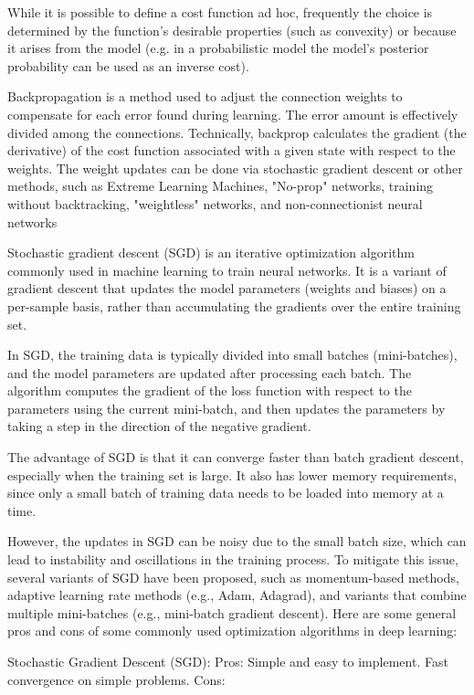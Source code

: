 While it is possible to define a cost function ad hoc, frequently the choice is determined by the function's desirable properties (such as convexity) or because it arises from the model (e.g. in a probabilistic model the model's posterior probability can be used as an inverse cost).

Backpropagation is a method used to adjust the connection weights to compensate for each error found during learning. The error amount is effectively divided among the connections. Technically, backprop calculates the gradient (the derivative) of the cost function associated with a given state with respect to the weights. The weight updates can be done via stochastic gradient descent or other methods, such as Extreme Learning Machines, "No-prop" networks, training without backtracking, "weightless" networks, and non-connectionist neural networks

Stochastic gradient descent (SGD) is an iterative optimization algorithm commonly used in machine learning to train neural networks. It is a variant of gradient descent that updates the model parameters (weights and biases) on a per-sample basis, rather than accumulating the gradients over the entire training set.

In SGD, the training data is typically divided into small batches (mini-batches), and the model parameters are updated after processing each batch. The algorithm computes the gradient of the loss function with respect to the parameters using the current mini-batch, and then updates the parameters by taking a step in the direction of the negative gradient.

The advantage of SGD is that it can converge faster than batch gradient descent, especially when the training set is large. It also has lower memory requirements, since only a small batch of training data needs to be loaded into memory at a time.

However, the updates in SGD can be noisy due to the small batch size, which can lead to instability and oscillations in the training process. To mitigate this issue, several variants of SGD have been proposed, such as momentum-based methods, adaptive learning rate methods (e.g., Adam, Adagrad), and variants that combine multiple mini-batches (e.g., mini-batch gradient descent).
Here are some general pros and cons of some commonly used optimization algorithms in deep learning:

Stochastic Gradient Descent (SGD):
Pros:
Simple and easy to implement.
Fast convergence on simple problems.
Cons:

